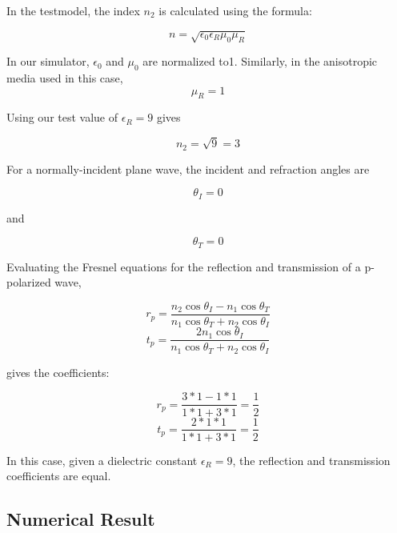 In the testmodel, the index $n_2$ is calculated using the formula:

\begin{equation}
n = \sqrt{\epsilon_0 \epsilon_R \mu_0 \mu_R}
\end{equation}

In our simulator, $\epsilon_0$ and $\mu_0$ are normalized to1. Similarly, in the anisotropic media used in this case, 
\begin{equation}
\mu_R = 1
\end{equation}

Using our test value of $\epsilon_R = 9$ gives 

\begin{equation}
n_2 = \sqrt{9} = 3
\end{equation}

For a normally-incident plane wave, the incident and refraction angles are

\begin{equation}
\theta_I = 0
\end{equation}

and

\begin{equation}
\theta_T = 0
\end{equation}

Evaluating the Fresnel equations for the reflection and transmission of a  p-polarized wave,

\begin{equation}
r_p = \frac{n_2 \cos \theta_I - n_1 \cos \theta_T}{n_1 \cos \theta_T + n_2 \cos \theta_I}
\end{equation}
\begin{equation}
t_p = \frac{2 n_1 \cos \theta_I}{n_1 \cos \theta_T + n_2 \cos \theta_I}
\end{equation}

gives the coefficients:

\begin{equation}
r_p = \frac{3 * 1- 1 * 1}{1 * 1 + 3 * 1} = \frac{1}{2}
\end{equation}
\begin{equation}
t_p = \frac{2 * 1 * 1}{1 * 1 + 3 * 1} = \frac{1}{2}
\end{equation}

In this case, given a dielectric constant $\epsilon_R  = 9$, the reflection and transmission coefficients are equal.

\subsection{Numerical Result}

